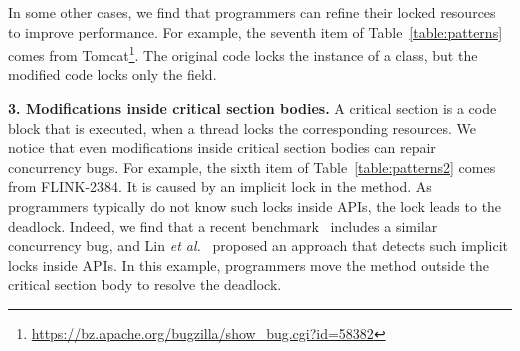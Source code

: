 In some other cases, we find that programmers can refine their locked resources to improve performance. For example, the seventh item of Table~\ref{table:patterns} comes from Tomcat\footnote{\url{https://bz.apache.org/bugzilla/show_bug.cgi?id=58382}}. The original code locks the instance of a class, but the modified code locks only the  field.

\noindent
\textbf{3. Modifications inside critical section bodies.} A critical section is a code block that is executed, when a thread locks the corresponding resources. We notice that even modifications inside critical section bodies can repair concurrency bugs. For example, the sixth item of Table~\ref{table:patterns2} comes from FLINK-2384. It is caused by an implicit lock in the  method. As programmers typically do not know such locks inside APIs, the lock leads to the deadlock. Indeed, we find that a recent benchmark~\cite{lin2015ase} includes a similar concurrency bug, and Lin \emph{et al.}~\cite{lin2016lockpeeker} proposed an approach that detects such implicit locks inside APIs. In this example, programmers move the  method outside the critical section body to resolve the deadlock.

%
%
%



